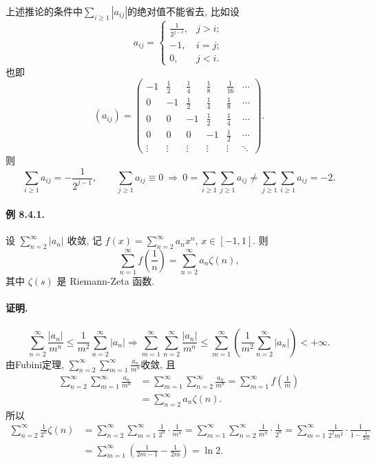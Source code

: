 上述推论的条件中$\sum_{i\ge1}\left|a_{ij}\right|$的绝对值不能省去, 比如设
\[
a_{ij}=\begin{cases}
	\frac{1}{2^{j-i}}, & j>i;\\
	-1, & i=j;\\
	0, & j<i.
\end{cases}
\]
也即
\[
\left(a_{ij}\right)=\begin{pmatrix}-1 & \frac{1}{2} & \frac{1}{4} & \frac{1}{8} & \frac{1}{16} & \cdots\\
	0 & -1 & \frac{1}{2} & \frac{1}{4} & \frac{1}{8} & \cdots\\
	0 & 0 & -1 & \frac{1}{2} & \frac{1}{4} & \cdots\\
	0 & 0 & 0 & -1 & \frac{1}{2} & \cdots\\
	\vdots & \vdots & \vdots & \vdots & \vdots & \ddots
\end{pmatrix}.
\]
则
\[
\sum_{i\ge1}a_{ij}=-\frac{1}{2^{j-1}},\qquad\sum_{j\ge1}a_{ij}\equiv0\ \Longrightarrow\ 0=\sum_{i\ge1}\sum_{j\ge1}a_{ij}\ne\sum_{j\ge1}\sum_{i\ge1}a_{ij}=-2.
\]


\paragraph{例 8.4.1. }

设 $\sum_{n=2}^{\infty}\left|a_{n}\right|$ 收敛, 记 $f(x)=\sum_{n=2}^{\infty}a_{n}x^{n}$,
$x\in[-1,1]$. 则 
\[
\sum_{n=1}^{\infty}f\left(\frac{1}{n}\right)=\sum_{n=2}^{\infty}a_{n}\zeta(n),
\]
其中 $\zeta(s)$ 是 Riemann-Zeta 函数.

\paragraph{证明.}

\[
\sum_{n=2}^{\infty}\frac{\left|a_{n}\right|}{m^{n}}\le\frac{1}{m^{2}}\sum_{n=2}^{\infty}\left|a_{n}\right|\Longrightarrow\sum_{m=1}^{\infty}\sum_{n=2}^{\infty}\frac{\left|a_{n}\right|}{m^{n}}\le\sum_{m=1}^{\infty}\left(\frac{1}{m^{2}}\sum_{n=2}^{\infty}\left|a_{n}\right|\right)<+\infty.
\]
由Fubini定理, $\sum_{n=2}^{\infty}\sum_{m=1}^{\infty}\frac{a_{n}}{m^{n}}$收敛,
且
\begin{align*}
	\sum_{n=2}^{\infty}\sum_{m=1}^{\infty}\frac{a_{n}}{m^{n}} & =\sum_{m=1}^{\infty}\sum_{n=2}^{\infty}\frac{a_{n}}{m^{n}}=\sum_{m=1}^{\infty}f\left(\frac{1}{m}\right)\\
	& =\sum_{n=2}^{\infty}a_{n}\zeta(n).
\end{align*}
所以
\begin{align*}
	\sum_{n=2}^{\infty}\frac{1}{2^{n}}\zeta(n) & =\sum_{n=2}^{\infty}\sum_{m=1}^{\infty}\frac{1}{2^{n}}\cdot\frac{1}{m^{n}}=\sum_{m=1}^{\infty}\sum_{n=2}^{\infty}\frac{1}{m^{n}}\cdot\frac{1}{2^{n}}=\sum_{m=1}^{\infty}\frac{1}{2^{2}m^{2}}\cdot\frac{1}{1-\frac{1}{2m}}\\
	& =\sum_{m=1}^{\infty}\left(\frac{1}{2m-1}-\frac{1}{2m}\right)=\ln2.
\end{align*}


